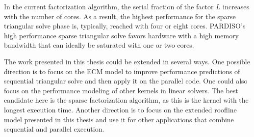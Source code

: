 In the current factorization algorithm, the serial fraction of the factor $L$
increases with the number of cores. As a result, the highest performance for the sparse triangular solve phase is, typically, reached with four or eight cores.
PARDISO's high performance sparse triangular solve favors hardware with a high
memory bandwidth that can ideally be saturated with one or two cores.

The work presented in this thesis could be extended in several ways. One possible direction is to focus on the ECM model to improve performance predictions of sequential triangular solve and then apply it on the parallel code.
One could also focus on the performance modeling of other kernels in linear solvers. The best candidate here is the sparse factorization algorithm, as this is the kernel with the longest execution time.
Another direction is to focus on the extended roofline model presented in this thesis and use it for other applications that combine sequential and parallel execution.
